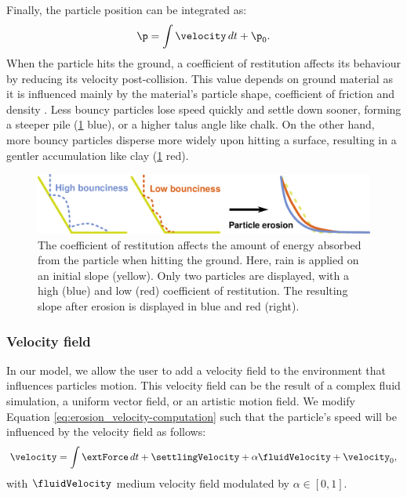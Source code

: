 Finally, the particle position can be integrated as: 
\begin{align} \nonumber
\p = \int{ \velocity \, dt} + \p_0.
\end{align}
When the particle hits the ground, a coefficient of restitution affects its behaviour by reducing its velocity post-collision. This value depends on ground material as it is influenced mainly by the material's particle shape, coefficient of friction and density \cite{Yan2020}. Less bouncy particles lose speed quickly and settle down sooner, forming a steeper pile (\cref{fig:erosion_coefficient of restitution-diagram} blue), or a higher talus angle like chalk. On the other hand, more bouncy particles disperse more widely upon hitting a surface, resulting in a gentler accumulation like clay (\cref{fig:erosion_coefficient of restitution-diagram} red).
\begin{figure}
\centering
\includegraphics{bounciness.pdf}
\caption{The coefficient of restitution affects the amount of energy absorbed from the particle when hitting the ground. Here, rain is applied on an initial slope (yellow). Only two particles are displayed, with a high (blue) and low (red) coefficient of restitution. The resulting slope after erosion is displayed in blue and red (right). }
\label{fig:erosion_coefficient of restitution-diagram}

\end{figure}

\subsubsection{Velocity field}
\label{sec:erosion_velocity_field_refinement}
In our model, we allow the user to add a velocity field to the environment that influences particles motion. This velocity field can be the result of a complex fluid simulation, a uniform vector field, or an artistic motion field.
We modify Equation \eqref{eq:erosion_velocity-computation} such that the particle's speed will be influenced by the velocity field as follows:
\begin{align} \label{eq:erosion_velocity-computation-final}
\velocity = \int{ \extForce \, dt} + \settlingVelocity + \alpha \fluidVelocity + \velocity_0,
\end{align}
with $\fluidVelocity$ medium velocity field modulated by $\alpha \in [0,1]$. 


